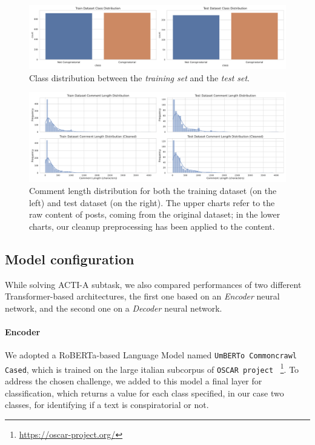 \documentclass[11pt]{article}
\begin{document}
\begin{figure}
  \centering
  \includegraphics[width=\textwidth]{figures/class_distribution.pdf}
  \caption{
    Class distribution between the \emph{training set} and the \emph{test set}.
  }
  \label{fig:class-frequency}
\end{figure}

\begin{figure}
  \centering
  \includegraphics[width=\textwidth]{figures/comment_length_distribution.pdf}
  \caption{
    Comment length distribution for both the training dataset (on the left) and test dataset
    (on the right).
    The upper charts refer to the raw content of posts, coming from the original dataset;
    in the lower charts, our cleanup preprocessing has been applied to the content.
  }
  \label{fig:words-distribution}
\end{figure}

\subsection{Model configuration}\label{sec:model-config}
While solving ACTI-A subtask, we also compared performances of two different Transformer-based architectures,
the first one based on an \emph{Encoder} neural network, and the second one on a \emph{Decoder} neural network.

\paragraph{Encoder}

We adopted a RoBERTa-based Language Model named \texttt{UmBERTo Commoncrawl Cased},
which is trained on the large italian subcorpus of \texttt{OSCAR project} ~\footnote{\url{https://oscar-project.org/}}.
%
To address the chosen challenge, we added to this model a final layer for classification,
which returns a value for each class specified,
in our case two classes, for identifying if a text is conspiratorial or not.
\end{document}
